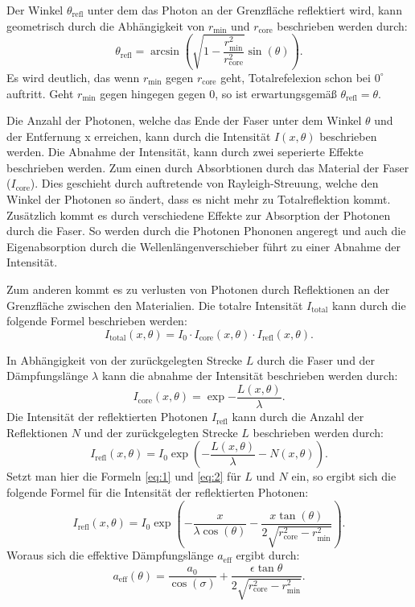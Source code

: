 Der Winkel $\theta_\text{refl}$ unter dem das Photon an der Grenzfläche reflektiert wird,
kann geometrisch durch die Abhängigkeit von $r_\text{min}$ und $r_\text{core}$ beschrieben werden durch:
\begin{equation}
    \theta_\text{refl} = \arcsin\left(\sqrt{1 -\frac{r^2_\text{min}}{r^2_\text{core}}}\sin(\theta)\right).    
    \label{eq:2}
\end{equation} 
Es wird deutlich,
das wenn $r_\text{min}$ gegen $r_\text{core}$ geht,
Totalrefelexion schon bei $0^\circ$ auftritt.
Geht $r_\text{min}$ gegen hingegen gegen $0$,
so ist erwartungsgemäß $\theta_\text{refl} = \theta$.

Die Anzahl der Photonen,
welche das Ende der Faser unter dem Winkel $\theta$ und der Entfernung x erreichen,
kann durch die Intensität $I(x,\theta)$ beschrieben werden.
Die Abnahme der Intensität,
kann durch zwei seperierte Effekte beschrieben werden.
Zum einen durch Absorbtionen durch das Material der Faser ($I_\text{core}$).
Dies geschieht durch auftretende von Rayleigh-Streuung, 
welche den Winkel der Photonen so ändert,
dass es nicht mehr zu Totalreflektion kommt.
Zusätzlich kommt es durch verschiedene Effekte zur Absorption der Photonen durch die Faser.
So werden durch die Photonen Phononen angeregt und auch die Eigenabsorption durch die Wellenlängenverschieber führt zu einer Abnahme der Intensität.

Zum anderen kommt es zu verlusten von Photonen durch Reflektionen an der Grenzfläche zwischen den Materialien.
Die totalre Intensität $I_\text{total}$ kann durch die folgende Formel beschrieben werden:
\begin{equation}
    I_\text{total}(x,\theta) = I_0 \cdot I_\text{core}(x,\theta) \cdot I_\text{refl}(x,\theta).
\end{equation}

In Abhängigkeit von der zurückgelegten Strecke $L$ durch die Faser und der Dämpfungslänge $\lambda$ kann die abnahme der Intensität beschrieben werden durch:
\begin{equation}
    I_\text{core}(x,\theta) = \exp{-\frac{L(x,\theta)}{\lambda}}.
\end{equation}
Die Intensität der reflektierten Photonen $I_\text{refl}$ kann durch die Anzahl der Reflektionen $N$ und der zurückgelegten Strecke $L$ beschrieben werden durch:
\begin{equation}
    I_\text{refl}(x,\theta) = I_0\exp{\left(-\frac{L(x,\theta)}{\lambda}-N(x,\theta)\right)}.
\end{equation}
Setzt man hier die Formeln \ref{eq:1} und \ref{eq:2} für $L$ und $N$ ein,
so ergibt sich die folgende Formel für die Intensität der reflektierten Photonen:
\begin{equation}
    I_\text{refl}(x,\theta) = I_0\exp{\left(-\frac{x}{\lambda \cos(\theta)}-\frac{x\tan(\theta)}{2\sqrt{r_\text{core}^2-r_\text{min}^2}}\right)}.
\end{equation}
Woraus sich die effektive Dämpfungslänge $a_\text{eff}$ ergibt durch:
\begin{equation}
    a_\text{eff}(\theta) = \frac{a_0}{\cos(\sigma)} + \frac{\epsilon\tan{\theta}}{2\sqrt{r^2_\text{core}-r^2_\text{min}}} .  
\end{equation}


